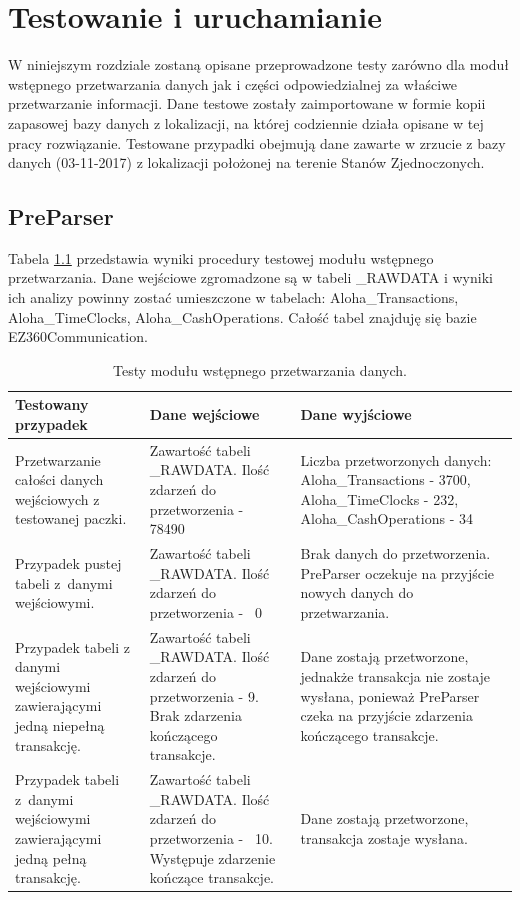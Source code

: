 \documentclass[a4paper]{book}
\begin{document}
\chapter{Testowanie i uruchamianie}
\label{rozdzial6}
W niniejszym rozdziale zostaną opisane przeprowadzone testy zarówno dla moduł wstępnego przetwarzania danych jak i części odpowiedzialnej za właściwe przetwarzanie informacji. Dane testowe zostały zaimportowane w formie kopii zapasowej bazy danych z lokalizacji, na której codziennie działa opisane w tej pracy rozwiązanie. Testowane przypadki obejmują dane zawarte w zrzucie z bazy danych (03-11-2017) z lokalizacji położonej na terenie Stanów Zjednoczonych.
\section {PreParser}
Tabela \ref{tab:testy_preparser} przedstawia wyniki procedury testowej modułu wstępnego przetwarzania.
Dane wejściowe zgromadzone są w tabeli \_RAWDATA i wyniki ich analizy powinny zostać umieszczone w tabelach: Aloha\_Transactions, Aloha\_TimeClocks, Aloha\_CashOperations. Całość tabel znajduję się bazie EZ360Communication. 
\begin{table}
	\centering
	\caption{Testy modułu wstępnego przetwarzania danych.}
	\begin{tabular}{|p{4cm}|p{4cm}|p{4cm}|}
		\hline
		Testowany przypadek & Dane wejściowe & Dane wyjściowe \\
		\hline
		Przetwarzanie całości danych wejściowych z testowanej paczki. & Zawartość tabeli \_RAWDATA. Ilość zdarzeń do przetworzenia -~ 78490  &  Liczba przetworzonych danych: Aloha\_Transactions - 3700, Aloha\_TimeClocks - 232, Aloha\_CashOperations - 34\\
		\hline
		Przypadek pustej tabeli z~danymi wejściowymi. & Zawartość tabeli \_RAWDATA. Ilość zdarzeń do przetworzenia -~ 0  & Brak danych do przetworzenia. PreParser oczekuje na przyjście nowych danych do przetwarzania. \\
		\hline
		Przypadek tabeli z danymi wejściowymi zawierającymi jedną niepełną transakcję. & Zawartość tabeli \_RAWDATA. Ilość zdarzeń do przetworzenia - 9. Brak zdarzenia kończącego transakcje.  & Dane zostają przetworzone, jednakże transakcja nie zostaje wysłana, ponieważ PreParser czeka na przyjście zdarzenia kończącego transakcje. \\
		\hline
		Przypadek tabeli z~danymi wejściowymi zawierającymi jedną pełną transakcję. & Zawartość tabeli \_RAWDATA. Ilość zdarzeń do przetworzenia -~ 10. Występuje zdarzenie kończące transakcje.  & Dane zostają przetworzone, transakcja zostaje wysłana. \\
		\hline 
	\end{tabular}
	\label{tab:testy_preparser}
\end{table}
\end{document}
